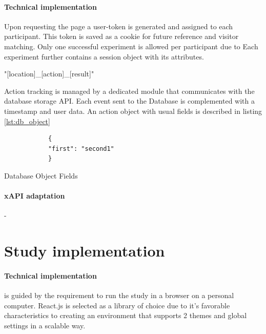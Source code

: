 	

		
		\paragraph{Technical implementation}
		
		Upon requesting the page a user-token is generated and assigned to each participant. This token is saved as a cookie for future reference and visitor matching. Only one successful experiment is allowed per participant due to 
		Each experiment further contains a session object with its attributes. 
		
		"[location]\_[action]\_[result]"
		
		
		Action tracking is managed by a dedicated module that communicates with the database storage API. Each event sent to the Database is complemented with a timestamp and user data. An action object with usual fields is described in listing \ref{lst:db_object}


	\begin{listing}[H]
		\begin{verbatim}
			{
			"first": "second1"
			}
		\end{verbatim}
		\caption{Database Object Fields}
		\label{lst:db_object}
	\end{listing}


		
		\paragraph{xAPI adaptation} - 
		

\section{Study implementation}



\paragraph{Technical implementation} is guided by the requirement to run the study in a browser on a personal computer. React.js is selected as a library of choice due to it's favorable characteristics to creating an environment that supports 2 themes and global settings in a scalable way. 


